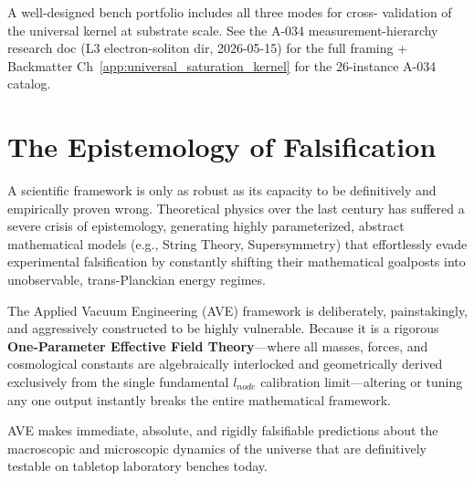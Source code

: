 A well-designed bench portfolio includes all three modes for cross-
validation of the universal kernel at substrate scale. See the A-034
measurement-hierarchy research doc (L3 electron-soliton dir, 2026-05-15)
for the full framing + Backmatter Ch~\ref{app:universal_saturation_kernel}
for the 26-instance A-034 catalog.

\section{The Epistemology of Falsification}

A scientific framework is only as robust as its capacity to be definitively and empirically proven wrong. Theoretical physics over the last century has suffered a severe crisis of epistemology, generating highly parameterized, abstract mathematical models (e.g., String Theory, Supersymmetry) that effortlessly evade experimental falsification by constantly shifting their mathematical goalposts into unobservable, trans-Planckian energy regimes.

The Applied Vacuum Engineering (AVE) framework is deliberately, painstakingly, and aggressively constructed to be highly vulnerable. Because it is a rigorous \textbf{One-Parameter Effective Field Theory}—where all masses, forces, and cosmological constants are algebraically interlocked and geometrically derived exclusively from the single fundamental $l_{node}$ calibration limit—altering or tuning any one output instantly breaks the entire mathematical framework. 

AVE makes immediate, absolute, and rigidly falsifiable predictions about the macroscopic and microscopic dynamics of the universe that are definitively testable on tabletop laboratory benches today.

